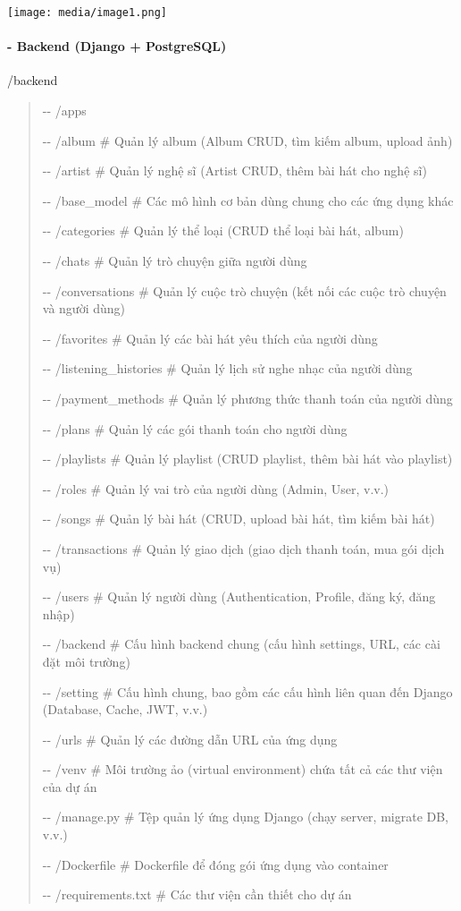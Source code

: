 \documentclass{article}
\begin{document}
\texttt{[image: media/image1.png]}

\paragraph{\texorpdfstring{\textbf{- Backend (Django +
PostgreSQL)}}{- Backend (Django + PostgreSQL)}}\label{backend-django-postgresql}

/backend

\begin{quote}
\textbar-\/- /apps

\textbar-\/- /album \# Quản lý album (Album CRUD, tìm kiếm album, upload
ảnh)

\textbar-\/- /artist \# Quản lý nghệ sĩ (Artist CRUD, thêm bài hát cho
nghệ sĩ)

\textbar-\/- /base\_model \# Các mô hình cơ bản dùng chung cho các ứng
dụng khác

\textbar-\/- /categories \# Quản lý thể loại (CRUD thể loại bài hát,
album)

\textbar-\/- /chats \# Quản lý trò chuyện giữa người dùng

\textbar-\/- /conversations \# Quản lý cuộc trò chuyện (kết nối các cuộc
trò chuyện và người dùng)

\textbar-\/- /favorites \# Quản lý các bài hát yêu thích của người dùng

\textbar-\/- /listening\_histories \# Quản lý lịch sử nghe nhạc của
người dùng

\textbar-\/- /payment\_methods \# Quản lý phương thức thanh toán của
người dùng

\textbar-\/- /plans \# Quản lý các gói thanh toán cho người dùng

\textbar-\/- /playlists \# Quản lý playlist (CRUD playlist, thêm bài hát
vào playlist)

\textbar-\/- /roles \# Quản lý vai trò của người dùng (Admin, User,
v.v.)

\textbar-\/- /songs \# Quản lý bài hát (CRUD, upload bài hát, tìm kiếm
bài hát)

\textbar-\/- /transactions \# Quản lý giao dịch (giao dịch thanh toán,
mua gói dịch vụ)

\textbar-\/- /users \# Quản lý người dùng (Authentication, Profile, đăng
ký, đăng nhập)

\textbar-\/- /backend \# Cấu hình backend chung (cấu hình settings, URL,
các cài đặt môi trường)

\textbar-\/- /setting \# Cấu hình chung, bao gồm các cấu hình liên quan
đến Django (Database, Cache, JWT, v.v.)

\textbar-\/- /urls \# Quản lý các đường dẫn URL của ứng dụng

\textbar-\/- /venv \# Môi trường ảo (virtual environment) chứa tất cả
các thư viện của dự án

\textbar-\/- /manage.py \# Tệp quản lý ứng dụng Django (chạy server,
migrate DB, v.v.)

\textbar-\/- /Dockerfile \# Dockerfile để đóng gói ứng dụng vào
container

\textbar-\/- /requirements.txt \# Các thư viện cần thiết cho dự án
\end{quote}
\end{document}
